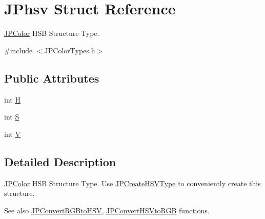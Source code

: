 \hypertarget{struct_j_phsv}{
\section{JPhsv Struct Reference}
\label{struct_j_phsv}
}


\hyperlink{interface_j_p_color}{JPColor} HSB Structure Type.  




{\ttfamily \#include $<$JPColorTypes.h$>$}

\subsection*{Public Attributes}
\begin{DoxyCompactItemize}
\item 
int \hyperlink{struct_j_phsv_af51305d2a2125194b5a798e6e788b71f}{H}
\item 
int \hyperlink{struct_j_phsv_a6576c0c116f985e6f5b4698290c8ae74}{S}
\item 
int \hyperlink{struct_j_phsv_ab1b3d51bc3064ceef684c4c957547773}{V}
\end{DoxyCompactItemize}


\subsection{Detailed Description}
\hyperlink{interface_j_p_color}{JPColor} HSB Structure Type. Use \hyperlink{_j_p_color_functions_8h_ac6031c5fd2d719a6b618d030c86cc6ac}{JPCreateHSVType} to conveniently create this structure. \begin{DoxySeeAlso}{See also}
\hyperlink{_j_p_color_convert_functions_8h_ab9d9002d48aff333c31d3b5c30512648}{JPConvertRGBtoHSV}, \hyperlink{_j_p_color_convert_functions_8h_a5dc60c232611ea3801fa48d1b77dc9f7}{JPConvertHSVtoRGB} functions. 
\end{DoxySeeAlso}


